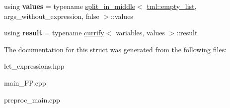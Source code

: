 \begin{DoxyCompactItemize}
\item 
\hypertarget{structtml_1_1impl_1_1multi__let__currifier_a704710d5d8e1d144821bb56b2025eab8}{using {\bfseries values} = typename \hyperlink{structtml_1_1impl_1_1multi__let__currifier_1_1split__in__middle}{split\+\_\+in\+\_\+middle}$<$ \hyperlink{structtml_1_1list}{tml\+::empty\+\_\+list}, args\+\_\+without\+\_\+expression, false $>$\+::values}\label{structtml_1_1impl_1_1multi__let__currifier_a704710d5d8e1d144821bb56b2025eab8}

\item 
\hypertarget{structtml_1_1impl_1_1multi__let__currifier_aea293d4760e8c0d547d2459c9148dc98}{using {\bfseries result} = typename \hyperlink{structtml_1_1impl_1_1multi__let__currifier_1_1currify}{currify}$<$ variables, values $>$\+::result}\label{structtml_1_1impl_1_1multi__let__currifier_aea293d4760e8c0d547d2459c9148dc98}

\end{DoxyCompactItemize}


The documentation for this struct was generated from the following files\+:\begin{DoxyCompactItemize}
\item 
let\+\_\+expressions.\+hpp\item 
main\+\_\+\+P\+P.\+cpp\item 
preproc\+\_\+main.\+cpp\end{DoxyCompactItemize}
